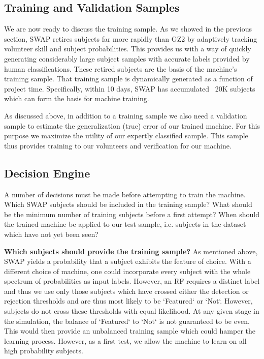 \documentclass[twocolumn]{aastex6}
\begin{document}
\subsection{Training and Validation Samples}
We are now ready to discuss the training sample. As we showed in the previous 
section, SWAP retires subjects far more rapidly than GZ2
by adaptively tracking volunteer skill and subject probabilities. This provides us
with a way of quickly generating considerably large subject samples with accurate
labels provided by human classifications. These retired subjects are the basis of the 
machine's training sample. That training sample is dynamically generated as a function
of project time. Specifically, within 10 days, SWAP has accumulated ~20K 
subjects which can form the basis for machine training. 

As discussed above, in addition to a training sample we also need a validation 
sample to estimate the generalization (true) error of our trained machine. For 
this purpose we maximize the utility of our expertly classified sample. This sample
thus provides training to our volunteers and verification for our machine. 

\subsection{Decision Engine}
A number of decisions must be made before attempting to train the machine. 
Which SWAP subjects should be included in the training sample? 
What should be the minimum number of training subjects before a first attempt?
When should the trained machine be applied to our test sample, i.e. subjects
in the dataset which have not yet been seen? 

\textbf{Which subjects should provide the training sample?} As mentioned above, SWAP
yields a probability that a subject exhibits the feature of choice. With a 
different choice of machine, one could incorporate every subject with the
whole spectrum of probabilities as input labels. However, an RF requires a
distinct label and thus we use only those subjects which have crossed either
the detection or rejection thresholds and are thus most likely to be `Featured`
or `Not`.  However, subjects do not cross these thresholds  with equal likelihood. 
At any given stage in the simulation, the balance of `Featured` to `Not` is not
guaranteed to be even. This would then provide an unbalanced training sample
which could hamper the learning process. However, as a first test, we allow
the machine to learn on all high probability subjects. 
\end{document}
